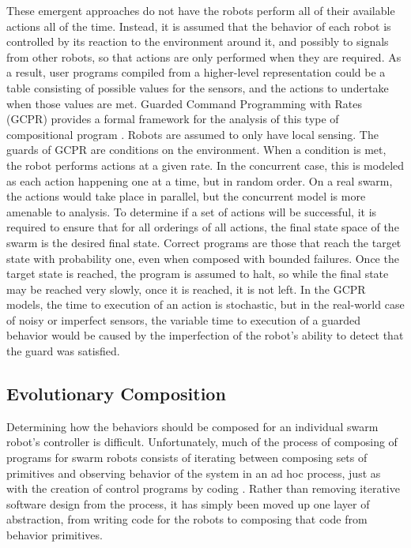 These emergent approaches do not have the robots perform all of their available actions all of the time. 
Instead, it is assumed that the behavior of each robot is controlled by its reaction to the environment around it, and possibly to signals from other robots, so that actions are only performed when they are required. 
As a result, user programs compiled from a higher-level representation could be a table consisting of possible values for the sensors, and the actions to undertake when those values are met.
Guarded Command Programming with Rates (GCPR) provides a formal framework for the analysis of this type of compositional program \citep{napp2011compositional}. 
Robots are assumed to only have local sensing.
The guards of GCPR are conditions on the environment.
When a condition is met, the robot performs actions at a given rate. 
In the concurrent case, this is modeled as each action happening one at a time, but in random order. 
On a real swarm, the actions would take place in parallel, but the concurrent model is more amenable to analysis. 
To determine if a set of actions will be successful, it is required to ensure that for all orderings of all actions, the final state space of the swarm is the desired final state. 
Correct programs are those that reach the target state with probability one, even when composed with bounded failures. 
Once the target state is reached, the program is assumed to halt, so while the final state may be reached very slowly, once it is reached, it is not left. 
In the GCPR models, the time to execution of an action is stochastic, but in the real-world case of noisy or imperfect sensors, the variable time to execution of a guarded behavior would be caused by the imperfection of the robot's ability to detect that the guard was satisfied. 

\subsection{Evolutionary Composition}

Determining how the behaviors should be composed for an individual swarm robot's controller is difficult. 
Unfortunately, much of the process of composing of programs for swarm robots consists of iterating between composing sets of primitives and observing behavior of the system in an ad hoc process, just as with the creation of control programs by coding \citep{palmer2005behavioral}. 
Rather than removing iterative software design from the process, it has simply been moved up one layer of abstraction, from writing code for the robots to composing that code from behavior primitives. 

